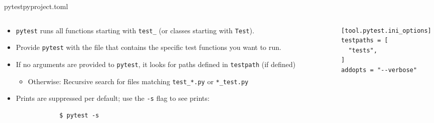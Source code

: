 \begin{splitframe}[fragile]{pytest}{pyproject.toml}
  \begin{columns}[t,onlytextwidth]
    \begin{column}{0.58\textwidth}
      \begin{itemize}
        \setlength{\itemsep}{1em}
        \item \texttt{pytest} runs all functions starting with \texttt{test\_} (or classes starting with \texttt{Test}).
        \item Provide \texttt{pytest} with the file that contains the specific test functions you want to run.
        \item If no arguments are provided to \texttt{pytest}, it looks for paths defined in \texttt{testpath} (if defined)
          \begin{itemize}
            \item [\to] Otherwise: Recursive search for files matching \texttt{test\_*.py} or \texttt{*\_test.py}
          \end{itemize}
        \item Prints are suppressed per default; use the \texttt{-s} flag to see prints:
          {
          \begin{verbatim}
            $ pytest -s
          \end{verbatim}
          }
      \end{itemize}
    \end{column}
    \begin{column}{0.38\textwidth}
      \begin{verbatim}
        [tool.pytest.ini_options]
        testpaths = [
          "tests",
        ]
        addopts = "--verbose"
      \end{verbatim}
    \end{column}
  \end{columns}
\end{splitframe}

